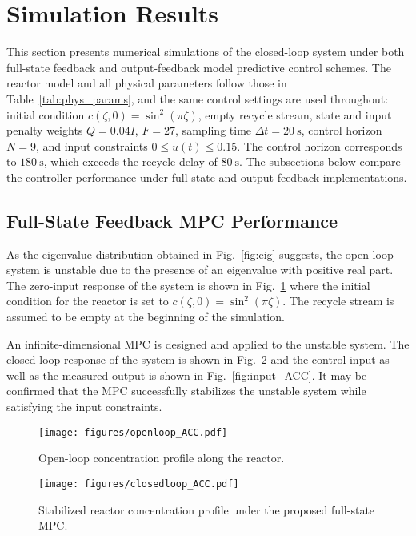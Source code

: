 \section{Simulation Results}

This section presents numerical simulations of the closed-loop system under both full-state feedback and output-feedback model predictive control schemes. The reactor model and all physical parameters follow those in Table~\ref{tab:phys_params}, and the same control settings are used throughout: initial condition $c(\zeta, 0) = \sin^2(\pi \zeta)$, empty recycle stream, state and input penalty weights $Q = 0.04 I$, $F = 27$, sampling time $\Delta t = 20~\mathrm{s}$, control horizon $N = 9$, and input constraints $0 \leq u(t) \leq 0.15$. The control horizon corresponds to $180~\mathrm{s}$, which exceeds the recycle delay of $80~\mathrm{s}$. The subsections below compare the controller performance under full-state and output-feedback implementations.

\subsection{Full-State Feedback MPC Performance}

As the eigenvalue distribution obtained in Fig.~\ref{fig:eig} suggests, the open-loop system is unstable due to the presence of an eigenvalue with positive real part. The zero-input response of the system is shown in Fig.~\ref{fig:open_ACC} where the initial condition for the reactor is set to $c(\zeta ,0) = \sin^2(\pi \zeta)$. The recycle stream is assumed to be empty at the beginning of the simulation.

An infinite-dimensional MPC is designed and applied to the unstable system. The closed-loop response of the system is shown in Fig.~\ref{fig:closed_ACC} and the control input as well as the measured output is shown in Fig.~\ref{fig:input_ACC}. It may be confirmed that the MPC successfully stabilizes the unstable system while satisfying the input constraints.

\begin{figure}[htbp]
    \centering
    \texttt{[image: figures/openloop\_ACC.pdf]}
    \caption{Open-loop concentration profile along the reactor.}
    \label{fig:open_ACC}
\end{figure}

\begin{figure}[htbp]
    \centering
    \texttt{[image: figures/closedloop\_ACC.pdf]}
    \caption{Stabilized reactor concentration profile under the proposed full-state MPC.}
    \label{fig:closed_ACC}
\end{figure}

